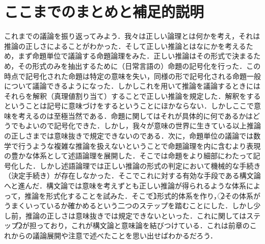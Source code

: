 \documentclass[10pt,b5paper,papersize,dvipdfmx]{jsbook}
\begin{document}
\section{ここまでのまとめと補足的説明}
これまでの議論を振り返ってみよう．我々は正しい論理とは何かを考え，それは推論の正しさによることがわかった．そして正しい推論とはなにかを考えるため，まず命題単位で議論する命題論理をみた．正しい推論はその形式で決まるため，その形式のみを抽出するために（日常言語の）命題の記号化を行った．この時点で記号化された命題は特定の意味を失い，同様の形で記号化される命題一般について議論できるようになった．しかしこれを用いて推論を議論するときにはそれらを解釈（真理値割り当て）することで正しい推論を規定した．解釈をするということは記号に意味づけをするということにほかならない．しかしここで意味を考えるのは至極当然である．命題に関してはそれが具体的に何であるかはどうでもよいので記号化できた．しかし，我々が意味の世界に生きている以上推論の正しさまでは意味抜きで規定できないのである．次に，命題単位の議論では数学で行うような複雑な推論を扱えないということで命題論理を内に含むより表現の豊かな体系として述語論理を展開した．そこでは命題をより細部にわたって記号化した．しかし述語論理では正しい推論の形式の判定において機械的な手続き（決定手続き）が存在しなかった．そこでこれに対する有効な手段である構文論へと進んだ．構文論では意味を考えずとも正しい推論が得られるような体系によって，推論を形式化することを試みた．そこで\textcircled{\scriptsize 1}形式的体系を作り，\textcircled{\scriptsize 2}その体系がうまくいっているか確かめるという二つのステップを踏むことにした．しかし少し前，推論の正しさは意味抜きでは規定できないといった．これに関してはステップ\textcircled{\scriptsize 2}が担っており，これが構文論と意味論を結びつけている．これは前章のこれからの議論展開や注意で述べたことを思い出せばわかるだろう．
\end{document}
